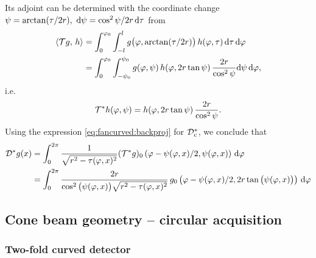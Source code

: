 \documentclass{amsart}
\renewcommand*{\phi}{\varphi}
\begin{document}
%
Its adjoint can be determined with the coordinate change $\psi = \arctan(\tau/2r),\ \mathrm{d}\psi = \cos^2\psi / 2r\, \mathrm{d}\tau$ from
%
\begin{align*}
 \INNER{\OPT g}{h} 
 &= \int_0^{\phi_0} \int_{-l}^l g\big(\phi, \arctan(\tau/2r)\big)\, h(\phi, \tau)\, \D\tau\, \D\phi \\
 &= \int_0^{\phi_0} \int_{-\psi_0}^{\psi_0} g(\phi, \psi)\, h(\phi, 2r\tan\psi)\, \frac{2r}{\cos^2\psi} \D\psi\, \D\phi,
\end{align*}
%
i.e.
%
\begin{equation}
 \label{eq:fanflat:curved2flat_adj}
 \DUALOPT h(\phi, \psi) = h(\phi, 2r\tan\psi)\, \frac{2r}{\cos^2\psi}.
\end{equation} 
%
%
Using the expression \eqref{eq:fancurved:backproj} for ${\mathcal{D}}_{\mathrm{c}}^*$, we conclude that
%
\begin{align}
 \DUALOPD g(x) 
 &= \int_0^{2\pi} \frac{1}{\sqrt{r^2-\tau(\phi, x)^2}} (\DUALOPT g)_0\left(\phi - \psi(\phi,x)/2, \psi(\phi,x) \right)\, \D\phi 
 \notag \\
 \label{eq:fanflat:backproj}
 &= \int_0^{2\pi} \frac{2r}{\cos^2\big(\psi(\phi,x)\big)\sqrt{r^2-\tau(\phi, x)^2}}\,
 g_0\left(\phi - \psi(\phi,x)/2, 2r \tan\big(\psi(\phi,x)\big) \right)\, \D\phi 
\end{align} 



\subsection{Cone beam geometry -- circular acquisition}
\label{sec:applications:cone_circular}

\subsubsection{Two-fold curved detector}
\label{sec:applications:cone_circular:twofoldcurved}
\end{document}
